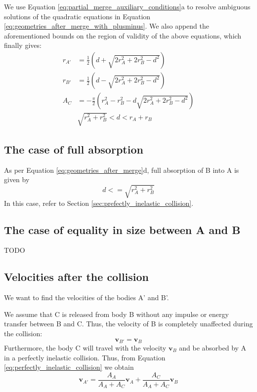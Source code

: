 \documentclass{article}
\newcommand{\vbs}[0]{\boldsymbol{v}}
\begin{document}
We use Equation \ref{eq:partial_merge_auxiliary_conditions}a to resolve ambiguous solutions of the quadratic equations in Equation \ref{eq:geometries_after_merge_with_plusminus}. We also append the aforementioned bounds on the region of validity of the above equations, which finally gives:
\begin{equation}
\label{eq:geometries_after_merge}
\begin{split}
r_{A'} &= \frac{1}{2}\left(d + \sqrt{2r_A^2 + 2r_B^2 - d^2}\right)\\
r_{B'} &= \frac{1}{2}\left(d - \sqrt{2r_A^2 + 2r_B^2 - d^2}\right)\\
A_C &= -\frac{\pi}{2}\left(r_A^2 - r_B^2 - d\sqrt{2r_A^2 + 2r_B^2 - d^2}\right)\\
&\sqrt{r_A^2 + r_B^2} < d < r_A + r_B
\end{split}
\end{equation}

\subsection{The case of full absorption}
As per Equation \ref{eq:geometries_after_merge}d, full absorption of B into A is given by
\begin{equation}
d <= \sqrt{r_A^2 + r_B^2}
\end{equation}
In this case, refer to Section \ref{sec:prefectly_inelastic_collision}.

\subsection{The case of equality in size between A and B}
TODO



\subsection{Velocities after the collision}
We want to find the velocities of the bodies A' and B'.

We assume that C is released from body B without any impulse or energy transfer between B and C. Thus, the velocity of B is completely unaffected during the collision:
\begin{equation}
\vbs_{B'} = \vbs_B
\end{equation}
Furthermore, the body C will travel with the velocity $\vbs_B$ and be absorbed by A in a perfectly inelastic collision. Thus, from Equation \ref{eq:perfectly_inelastic_collision} we obtain
\begin{equation}
\vbs_{A'} = \frac{A_A}{A_A + A_C}\vbs_A + \frac{A_C}{A_A + A_C}\vbs_B
\end{equation}
\end{document}
